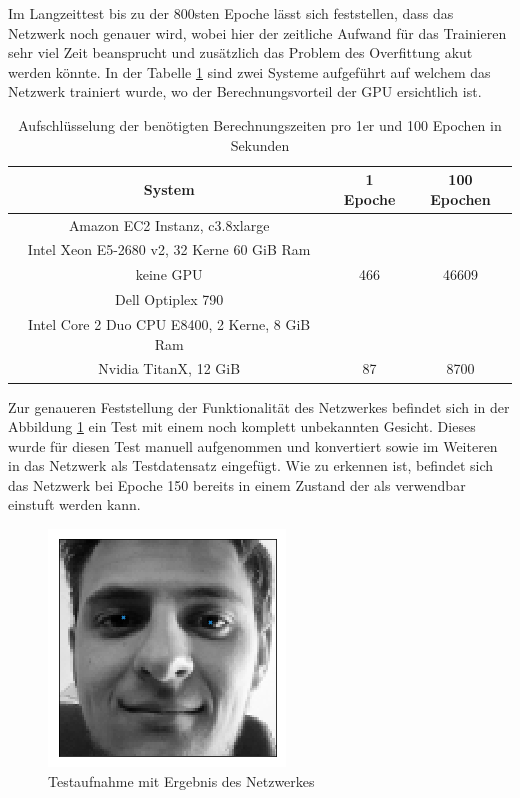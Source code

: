 \noindent
Im Langzeittest bis zu der 800sten Epoche lässt sich feststellen, dass das Netzwerk noch genauer wird, wobei hier der zeitliche Aufwand für das Trainieren sehr viel Zeit beansprucht und zusätzlich das Problem des Overfittung akut werden könnte. 
In der Tabelle \ref{tab:time} sind zwei Systeme aufgeführt auf welchem das Netzwerk trainiert wurde, wo der Berechnungsvorteil der GPU ersichtlich ist. 
\begin{table}[htb]%
\centering%
\begin{tabular}{c c c}
System & 1 Epoche & 100 Epochen \\ 
\hline 
Amazon EC2 Instanz, c3.8xlarge \\ Intel Xeon E5-2680 v2, 32 Kerne 60 GiB Ram \\ keine GPU & 466 & 46609 \\ 
\hline 
Dell Optiplex 790 \\ Intel Core 2 Duo CPU E8400, 2 Kerne, 8 GiB Ram \\ Nvidia TitanX, 12 GiB & 87 & 8700 \\ 
\end{tabular} 
\caption{Aufschlüsselung der benötigten Berechnungszeiten pro 1er und 100 Epochen in Sekunden}
\label{tab:time}
\end{table} \phantom \newline

\noindent
Zur genaueren Feststellung der Funktionalität des Netzwerkes befindet sich in der Abbildung \ref{fig:meTest} ein Test mit einem noch komplett unbekannten Gesicht. 
Dieses wurde für diesen Test manuell aufgenommen und konvertiert sowie im Weiteren in das Netzwerk als Testdatensatz eingefügt. 
Wie zu erkennen ist, befindet sich das Netzwerk bei Epoche 150 bereits in einem Zustand der als verwendbar  einstuft werden kann. 
\begin{figure}[ht!]
	\centering
	\includegraphics[scale=0.8]{images/me-test.png}
	\caption{Testaufnahme mit Ergebnis des Netzwerkes}
	\label{fig:meTest}
\end{figure}

